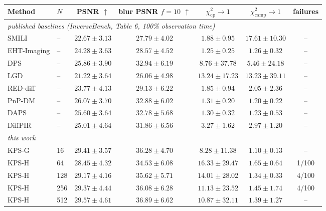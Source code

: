 \footnotesize
\setlength{\tabcolsep}{3.5pt}
\begin{tabular}{llccccc}
\toprule
Method & $N$ & PSNR $\uparrow$ & \shortstack{blur PSNR\\$f{=}10$ $\uparrow$} & $\chi^2_{\text{cp}}\to 1$ & $\chi^2_{\text{camp}}\to 1$ & failures \\
\midrule
\multicolumn{7}{l}{\emph{published baselines (InverseBench, Table 6, 100\% observation time)}} \\
SMILI & -- & $22.67 \pm 3.13$ & $27.79 \pm 4.02$ & $1.88 \pm 0.95$ & $17.61 \pm 10.30$ & -- \\
EHT-Imaging & -- & $24.28 \pm 3.63$ & $28.57 \pm 4.52$ & $1.25 \pm 0.25$ & $1.26 \pm 0.32$ & -- \\
DPS & -- & $25.86 \pm 3.90$ & $32.94 \pm 6.19$ & $8.76 \pm 37.78$ & $5.46 \pm 24.18$ & -- \\
LGD & -- & $21.22 \pm 3.64$ & $26.06 \pm 4.98$ & $13.24 \pm 17.23$ & $13.23 \pm 39.11$ & -- \\
RED-diff & -- & $23.77 \pm 4.13$ & $29.13 \pm 6.22$ & $1.85 \pm 0.94$ & $2.05 \pm 2.36$ & -- \\
PnP-DM & -- & $26.07 \pm 3.70$ & $32.88 \pm 6.02$ & $1.31 \pm 0.20$ & $1.20 \pm 0.22$ & -- \\
DAPS & -- & $25.60 \pm 3.64$ & $32.78 \pm 5.68$ & $1.30 \pm 0.32$ & $1.23 \pm 0.53$ & -- \\
DiffPIR & -- & $25.01 \pm 4.64$ & $31.86 \pm 6.56$ & $3.27 \pm 1.62$ & $2.97 \pm 1.20$ & -- \\
\midrule
\multicolumn{7}{l}{\emph{this work}} \\
KPS-G & 16 & $29.41 \pm 3.57$ & $36.28 \pm 4.70$ & $8.28 \pm 11.38$ & $1.10 \pm 0.13$ & -- \\
KPS-H & 64 & $28.45 \pm 4.32$ & $34.53 \pm 6.08$ & $16.33 \pm 29.47$ & $1.65 \pm 0.64$ & 1/100 \\
KPS-H & 128 & $29.17 \pm 4.16$ & $35.62 \pm 5.71$ & $14.01 \pm 28.02$ & $1.34 \pm 0.33$ & 4/100 \\
KPS-H & 256 & $29.37 \pm 4.44$ & $36.08 \pm 6.28$ & $11.13 \pm 23.52$ & $1.45 \pm 1.74$ & 4/100 \\
KPS-H & 512 & $29.57 \pm 4.61$ & $36.89 \pm 6.62$ & $10.87 \pm 32.11$ & $1.39 \pm 1.27$ & -- \\
\bottomrule
\end{tabular}
